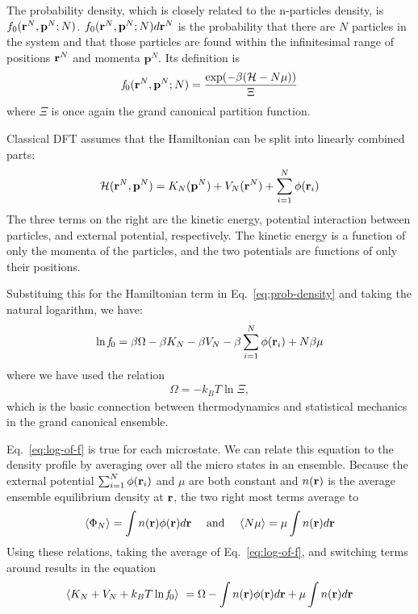 The probability density, which is closely related to the n-particles
density, is $f_0(\textbf{r}^N,\mathbf{p}^N;N)$.
$f_0(\textbf{r}^N,\mathbf{p}^N;N)d\textbf{r}^N$ is the probability that there are
$N$ particles in the system and that those particles are found within
the infinitesimal range of positions $\textbf{r}^N$ and momenta
$\mathbf{p}^N$.  Its definition is
\begin{align}
  \label{eq:prob-density}
  \mathit{f}_0(\textbf{r}^N,\mathbf{p}^N;N) = \frac{\exp(-\beta(\mathcal{H}-N\mu))}{\Xi}
\end{align}
where $\Xi$ is once again the grand canonical partition function.

Classical DFT assumes that the Hamiltonian can be split into linearly
combined parts:
\begin{align}\label{eq:hamiltonian}
  \mathcal{H}(\textbf{r}^N,\mathbf{p}^N) = K_N(\mathbf{p}^N) + V_N(\textbf{r}^N) + \sum^N_{i=1}\phi(\textbf{r}_i)
\end{align}
The three terms on the right are the kinetic energy, potential
interaction between particles, and external potential, respectively.
The kinetic energy is a function of only the momenta of the particles,
and the two potentials are functions of only their positions.

Substituing this for the Hamiltonian term in Eq.~\ref{eq:prob-density}
and taking the natural logarithm, we have:
\begin{align}
  \label{eq:log-of-f}
  \ln \mathit{f}_0 = \beta\Omega - \beta K_N - \beta V_N - \beta \sum^N_{i=1}\phi(\textbf{r}_i) + N\beta \mu
\end{align}
where we have used the relation
\begin{align}
  \Omega = -k_BT\ln\Xi,
\end{align}
which is the basic connection between thermodynamics and statistical
mechanics in the grand canonical ensemble.

Eq.~\ref{eq:log-of-f} is true for each microstate.  We can relate this
equation to the density profile by averaging over all the micro states
in an ensemble.  Because the external potential
$\sum^N_{i=1}\phi(\textbf{r}_i)$ and $\mu$ are both constant and $n(\textbf{r})$ is
the average ensemble equilibrium density at $\textbf{r}$, the two right most
terms average to
\begin{align}
  \langle \Phi_N \rangle = \int n(\textbf{r})\phi(\textbf{r})d\textbf{r} \
  \quad\text{and}\quad \
  \langle N\mu \rangle = \mu \int n(\textbf{r}) d\textbf{r}
\end{align}
Using these relations, taking the average of Eq.~\ref{eq:log-of-f},
and switching terms around results in the equation
\begin{align} \label{eq:intrinsic-free-two}
  \langle K_N + V_N + k_BT \ln \mathit{f}_0 \rangle \
  = \Omega - \int n(\textbf{r})\phi(\textbf{r})d\textbf{r} + \mu \int n(\textbf{r})d\textbf{r}
\end{align}

